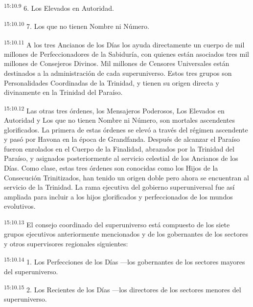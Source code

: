 \par
\textsuperscript{15:10.9} 6. Los Elevados en Autoridad.

\par
\textsuperscript{15:10.10} 7. Los que no tienen Nombre ni Número.

\par
\textsuperscript{15:10.11} A los tres Ancianos de los Días los ayuda directamente un cuerpo de mil millones de Perfeccionadores de la Sabiduría, con quienes están asociados tres mil millones de Consejeros Divinos. Mil millones de Censores Universales están destinados a la administración de cada superuniverso. Estos tres grupos son Personalidades Coordinadas de la Trinidad, y tienen su origen directa y divinamente en la Trinidad del Paraíso.

\par
\textsuperscript{15:10.12} Las otras tres órdenes, los Mensajeros Poderosos, Los Elevados en Autoridad y Los que no tienen Nombre ni Número, son mortales ascendentes glorificados. La primera de estas órdenes se elevó a través del régimen ascendente y pasó por Havona en la época de Grandfanda. Después de alcanzar el Paraíso fueron enrolados en el Cuerpo de la Finalidad, abrazados por la Trinidad del Paraíso, y asignados posteriormente al servicio celestial de los Ancianos de los Días. Como clase, estas tres órdenes son conocidas como los Hijos de la Consecución Trinitizados, han tenido un origen doble pero ahora se encuentran al servicio de la Trinidad. La rama ejecutiva del gobierno superuniversal fue así ampliada para incluir a los hijos glorificados y perfeccionados de los mundos evolutivos.

\par
\textsuperscript{15:10.13} El consejo coordinado del superuniverso está compuesto de los siete grupos ejecutivos anteriormente mencionados y de los gobernantes de los sectores y otros supervisores regionales siguientes:

\par
\textsuperscript{15:10.14} 1. Los Perfecciones de los Días ---los gobernantes de los sectores mayores del superuniverso.

\par
\textsuperscript{15:10.15} 2. Los Recientes de los Días ---los directores de los sectores menores del superuniverso.

